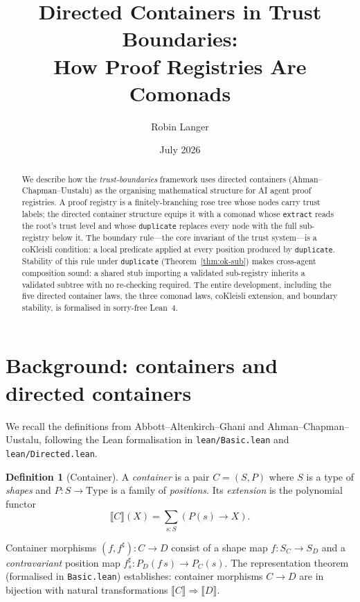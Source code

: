 \documentclass[11pt,a4paper]{article}
\title{Directed Containers in Trust Boundaries:\\
How Proof Registries Are Comonads}
\author{Robin Langer}
\date{July 2026}
\theoremstyle{definition}
\newtheorem{definition}{Definition}[section]
\theoremstyle{plain}
\theoremstyle{remark}
\begin{document}
\maketitle

\begin{abstract}
We describe how the \emph{trust-boundaries} framework uses directed
containers (Ahman--Chapman--Uustalu) as the organising mathematical
structure for AI agent proof registries. A proof registry is a
finitely-branching rose tree whose nodes carry trust labels; the
directed container structure equips it with a comonad whose
\texttt{extract} reads the root's trust level and whose
\texttt{duplicate} replaces every node with the full sub-registry below
it. The boundary rule---the core invariant of the trust system---is a
coKleisli condition: a local predicate applied at every position
produced by \texttt{duplicate}. Stability of this rule under
\texttt{duplicate} (Theorem~\ref{thm:ok-sub}) makes cross-agent
composition sound: a shared stub importing a validated sub-registry
inherits a validated subtree with no re-checking required. The entire
development, including the five directed container laws, the three
comonad laws, coKleisli extension, and boundary stability, is
formalised in sorry-free Lean~4.
\end{abstract}

\tableofcontents

\section{Background: containers and directed containers}

We recall the definitions from Abbott--Altenkirch--Ghani and
Ahman--Chapman--Uustalu, following the Lean formalisation in
\texttt{lean/Basic.lean} and \texttt{lean/Directed.lean}.

\begin{definition}[Container]
A \emph{container} is a pair $C = (S, P)$ where $S$ is a type of
\emph{shapes} and $P : S \to \mathrm{Type}$ is a family of
\emph{positions}. Its \emph{extension} is the polynomial functor
\[
  \llbracket C \rrbracket(X) = \sum_{s : S} (P(s) \to X).
\]
\end{definition}

Container morphisms $(f, f^\sharp) : C \to D$ consist of a shape map
$f : S_C \to S_D$ and a \emph{contravariant} position map
$f^\sharp_s : P_D(f\,s) \to P_C(s)$. The representation theorem
(formalised in \texttt{Basic.lean}) establishes: container morphisms
$C \to D$ are in bijection with natural transformations
$\llbracket C \rrbracket \Rightarrow \llbracket D \rrbracket$.
\end{document}
